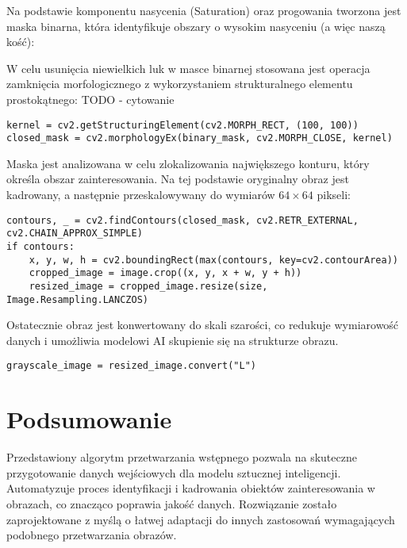 Na podstawie komponentu nasycenia (Saturation) oraz progowania tworzona jest maska binarna, która identyfikuje obszary o wysokim nasyceniu (a więc naszą kość):

W celu usunięcia niewielkich luk w masce binarnej stosowana jest operacja zamknięcia morfologicznego z wykorzystaniem strukturalnego elementu prostokątnego: \n
TODO - cytowanie

\begin{verbatim}
kernel = cv2.getStructuringElement(cv2.MORPH_RECT, (100, 100))
closed_mask = cv2.morphologyEx(binary_mask, cv2.MORPH_CLOSE, kernel)
\end{verbatim}

Maska jest analizowana w celu zlokalizowania największego konturu, który określa obszar zainteresowania. Na tej podstawie oryginalny obraz jest kadrowany, a następnie przeskalowywany do wymiarów $64 \times 64$ pikseli:

\begin{verbatim}
contours, _ = cv2.findContours(closed_mask, cv2.RETR_EXTERNAL, cv2.CHAIN_APPROX_SIMPLE)
if contours:
    x, y, w, h = cv2.boundingRect(max(contours, key=cv2.contourArea))
    cropped_image = image.crop((x, y, x + w, y + h))
    resized_image = cropped_image.resize(size, Image.Resampling.LANCZOS)
\end{verbatim}

Ostatecznie obraz jest konwertowany do skali szarości, co redukuje wymiarowość danych i umożliwia modelowi AI skupienie się na strukturze obrazu.

\begin{verbatim}
grayscale_image = resized_image.convert("L")
\end{verbatim}

\section{Podsumowanie}

Przedstawiony algorytm przetwarzania wstępnego pozwala na skuteczne przygotowanie danych wejściowych dla modelu sztucznej inteligencji.
Automatyzuje proces identyfikacji i kadrowania obiektów zainteresowania w obrazach, co znacząco poprawia jakość danych.
Rozwiązanie zostało zaprojektowane z myślą o łatwej adaptacji do innych zastosowań wymagających podobnego przetwarzania obrazów.

